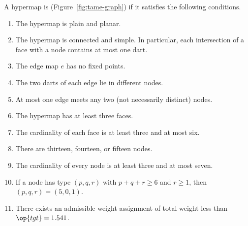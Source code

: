 \begin{definition}[tame]\label{def:tame}
A hypermap is  (Figure~\ref{fig:tame-graph}) 
if it satisfies the following conditions.
%
%
\begin{enumerate}\wasitemize 
\item {}  
The hypermap is plain and planar.
\item {} 
The hypermap is connected and simple.  In
  particular, each intersection of a face with a node contains at
  most one dart.
\item {} 
The edge map $e$ has no fixed points.
\item {} 
The two darts of each edge lie in different nodes.
\item {} 
At most one edge meets any two (not necessarily distinct) nodes.
\item {} 
  The hypermap has at least three faces.
\item {}
The cardinality of each face is at least three  and at most six.
\item {} 
There are  thirteen, fourteen, or fifteen nodes.
\item {} 
The cardinality of every node is at least three
  and at most seven.
\item {} 
If a node has type $(p,q,r)$ with $p+q+r\ge 6$ and $r\ge 1$, then $(p,q,r)=(5,0,1)$. 
\item {} 
There exists an admissible weight assignment
of total weight less than  $\op{tgt}=1.541$.
\end{enumerate}\wasitemize 
\end{definition}
%
%
%
%
%
%
%
%

